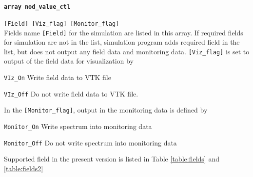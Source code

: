 \paragraph{\tt array nod\_value\_ctl}
\label{href_t:nod_value_ctl}
\verb|[Field] [Viz_flag] [Monitor_flag]| \\
Fields name \verb|[Field]| for the simulation are listed in this array. If required fields for simulation are not in the list, simulation program adds required field in the list, but does not output any field data and monitoring data. \verb|[Viz_flag]| is set to output of the field data for visualization by
%
\begin{description}
\item{\tt VIz\_On}  Write field data to VTK file
\item{\tt VIz\_Off} Do not write field data to VTK file.
\end{description}
%
In the \verb|[Monitor_flag]|, output in the monitoring data is defined by
%
\begin{description}
\item{\tt Monitor\_On}  Write spectrum into monitoring data
\item{\tt Monitor\_Off} Do not write spectrum into monitoring data
\end{description}
%
Supported field in the present version is listed in Table \ref{table:fields} and \ref{table:fields2} 
%
